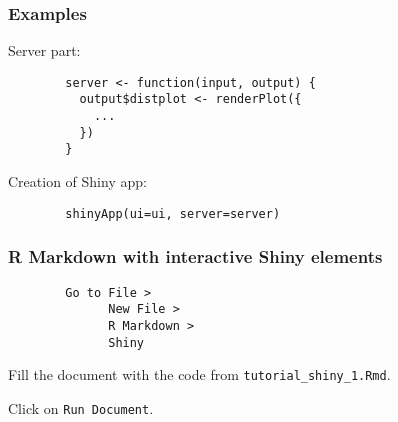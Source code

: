 \documentclass{beamer}
\begin{document}
	\begin{frame}[fragile]
		\frametitle{Examples}

		Server part:

		\begin{exampleblock}{}
		\begin{BVerbatim}
		server <- function(input, output) {
		  output$distplot <- renderPlot({
		    ...
		  })
		}
		\end{BVerbatim}
		\end{exampleblock}{}

		\vspace{2em}

		Creation of Shiny app:

		\begin{exampleblock}{}
		\begin{BVerbatim}
		shinyApp(ui=ui, server=server)
		\end{BVerbatim}
		\end{exampleblock}{}
	
	\end{frame}

	\begin{frame}[fragile]
		\frametitle{R Markdown with interactive Shiny elements}

		\begin{exampleblock}{}
		\begin{BVerbatim}
		Go to File >
		      New File >
		      R Markdown >
		      Shiny
		\end{BVerbatim}
		\end{exampleblock}{}

		\vspace{2em}

		Fill the document with the code from \verb|tutorial_shiny_1.Rmd|.

		\vspace{2em}

		Click on \verb|Run Document|.
	
	\end{frame}
\end{document}
